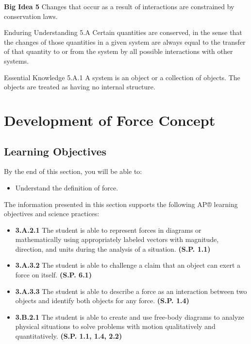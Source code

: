 \documentclass[
]{book}
\providecommand{\tightlist}{%
  \setlength{\itemsep}{0pt}\setlength{\parskip}{0pt}}
\begin{document}
\textbf{Big Idea 5} Changes that occur as a result of interactions are
constrained by conservation laws.

Enduring Understanding 5.A Certain quantities are conserved, in the
sense that the changes of those quantities in a given system are always
equal to the transfer of that quantity to or from the system by all
possible interactions with other systems.

Essential Knowledge 5.A.1 A system is an object or a collection of
objects. The objects are treated as having no internal structure.

\hypertarget{concept-trailer-newtons-laws}{}

\hypertarget{development-of-force-concept}{%
\section{Development of Force Concept}\label{development-of-force-concept}}

\hypertarget{fs-id2243190}{}
\hypertarget{learning-objectives-12}{%
\subsection{Learning Objectives}\label{learning-objectives-12}}

By the end of this section, you will be able to:

\begin{itemize}
\tightlist
\item
  Understand the definition of force.
\end{itemize}

The information presented in this section supports the following AP®
learning objectives and science practices:

\begin{itemize}
\tightlist
\item
  \textbf{3.A.2.1} The student is able to represent forces in diagrams or
  mathematically using appropriately labeled vectors with magnitude,
  direction, and units during the analysis of a situation. \textbf{(S.P.
  1.1)}
\item
  \textbf{3.A.3.2} The student is able to challenge a claim that an object
  can exert a force on itself. \textbf{(S.P. 6.1)}
\item
  \textbf{3.A.3.3} The student is able to describe a force as an
  interaction between two objects and identify both objects for any
  force. \textbf{(S.P. 1.4)}
\item
  \textbf{3.B.2.1} The student is able to create and use free-body diagrams
  to analyze physical situations to solve problems with motion
  qualitatively and quantitatively. \textbf{(S.P. 1.1, 1.4, 2.2)}
\end{itemize}
\end{document}
